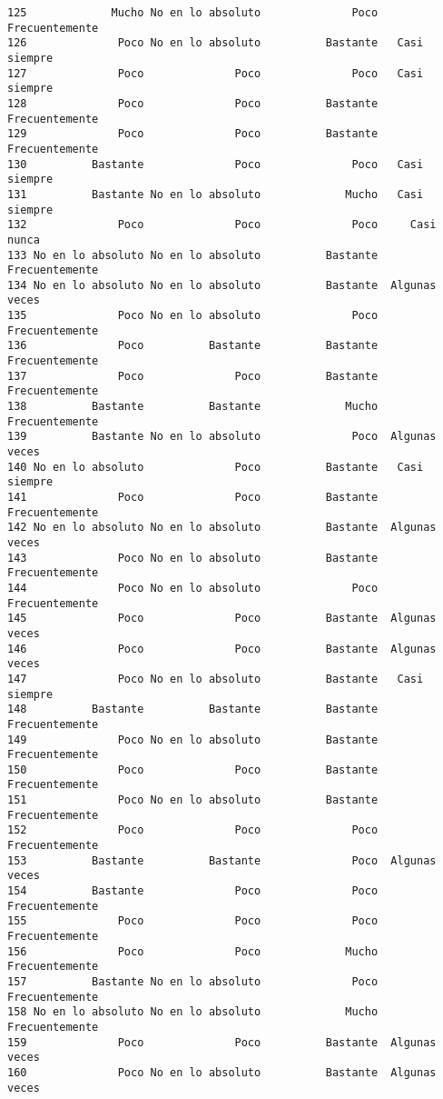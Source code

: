 \documentclass[
  letterpaper,
  DIV=11,
  numbers=noendperiod]{scrartcl}
\begin{document}
\begin{verbatim}
125             Mucho No en lo absoluto              Poco Frecuentemente
126              Poco No en lo absoluto          Bastante   Casi siempre
127              Poco              Poco              Poco   Casi siempre
128              Poco              Poco          Bastante Frecuentemente
129              Poco              Poco          Bastante Frecuentemente
130          Bastante              Poco              Poco   Casi siempre
131          Bastante No en lo absoluto             Mucho   Casi siempre
132              Poco              Poco              Poco     Casi nunca
133 No en lo absoluto No en lo absoluto          Bastante Frecuentemente
134 No en lo absoluto No en lo absoluto          Bastante  Algunas veces
135              Poco No en lo absoluto              Poco Frecuentemente
136              Poco          Bastante          Bastante Frecuentemente
137              Poco              Poco          Bastante Frecuentemente
138          Bastante          Bastante             Mucho Frecuentemente
139          Bastante No en lo absoluto              Poco  Algunas veces
140 No en lo absoluto              Poco          Bastante   Casi siempre
141              Poco              Poco          Bastante Frecuentemente
142 No en lo absoluto No en lo absoluto          Bastante  Algunas veces
143              Poco No en lo absoluto          Bastante Frecuentemente
144              Poco No en lo absoluto              Poco Frecuentemente
145              Poco              Poco          Bastante  Algunas veces
146              Poco              Poco          Bastante  Algunas veces
147              Poco No en lo absoluto          Bastante   Casi siempre
148          Bastante          Bastante          Bastante Frecuentemente
149              Poco No en lo absoluto          Bastante Frecuentemente
150              Poco              Poco          Bastante Frecuentemente
151              Poco No en lo absoluto          Bastante Frecuentemente
152              Poco              Poco              Poco Frecuentemente
153          Bastante          Bastante              Poco  Algunas veces
154          Bastante              Poco              Poco Frecuentemente
155              Poco              Poco              Poco Frecuentemente
156              Poco              Poco             Mucho Frecuentemente
157          Bastante No en lo absoluto              Poco Frecuentemente
158 No en lo absoluto No en lo absoluto             Mucho Frecuentemente
159              Poco              Poco          Bastante  Algunas veces
160              Poco No en lo absoluto          Bastante  Algunas veces

\end{verbatim}
\end{document}
